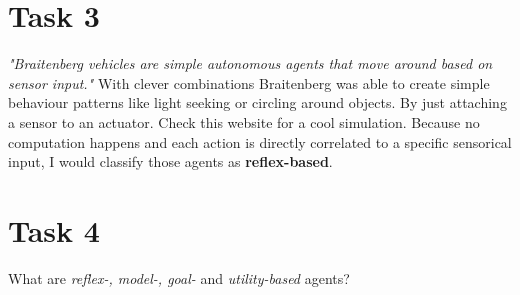 \documentclass{article}
\begin{document}
\section*{Task 3}
\emph{"Braitenberg vehicles are simple autonomous agents that move around based on sensor input."}\cite{harmendeweerd:1} With clever combinations
 Braitenberg was able to create simple behaviour patterns like light seeking or circling around objects. 
 By just attaching a sensor to an actuator. Check this website for a cool simulation\cite{harmendeweerd:1}. 
 Because no computation happens and each action is directly correlated to a specific sensorical input, 
 I would classify those agents as \textbf{reflex-based}.

\section*{Task 4}
What are  \emph{reflex-, model-, goal-} and \emph{utility-based} agents?

 

\end{document}
